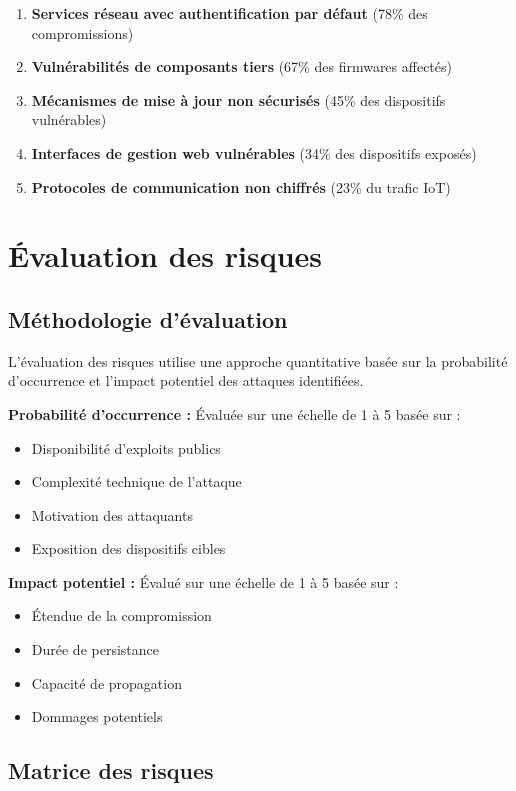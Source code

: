 \begin{enumerate}
    \item \textbf{Services réseau avec authentification par défaut} (78\% des compromissions)
    \item \textbf{Vulnérabilités de composants tiers} (67\% des firmwares affectés)
    \item \textbf{Mécanismes de mise à jour non sécurisés} (45\% des dispositifs vulnérables)
    \item \textbf{Interfaces de gestion web vulnérables} (34\% des dispositifs exposés)
    \item \textbf{Protocoles de communication non chiffrés} (23\% du trafic IoT)
\end{enumerate}

\section{Évaluation des risques}

\subsection{Méthodologie d'évaluation}

L'évaluation des risques utilise une approche quantitative basée sur la probabilité d'occurrence et l'impact potentiel des attaques identifiées.

\textbf{Probabilité d'occurrence :} Évaluée sur une échelle de 1 à 5 basée sur :
\begin{itemize}
    \item Disponibilité d'exploits publics
    \item Complexité technique de l'attaque
    \item Motivation des attaquants
    \item Exposition des dispositifs cibles
\end{itemize}

\textbf{Impact potentiel :} Évalué sur une échelle de 1 à 5 basée sur :
\begin{itemize}
    \item Étendue de la compromission
    \item Durée de persistance
    \item Capacité de propagation
    \item Dommages potentiels
\end{itemize}

\subsection{Matrice des risques}

